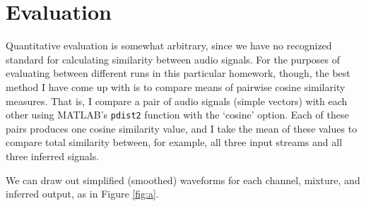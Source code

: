 \documentclass[11pt]{report}
\begin{document}
\section{Evaluation}

Quantitative evaluation is somewhat arbitrary, since we have no recognized standard for calculating similarity between audio signals. For the purposes of evaluating between different runs in this particular homework, though, the best method I have come up with is to compare means of pairwise cosine similarity measures. That is, I compare a pair of audio signals (simple vectors) with each other using MATLAB's \texttt{pdist2} function with the `cosine' option. Each of these pairs produces one cosine similarity value, and I take the mean of these values to compare total similarity between, for example, all three input streams and all three inferred signals.

We can draw out simplified (smoothed) waveforms for each channel, mixture, and inferred output, as in Figure \ref{fig:a}.

\end{document}
